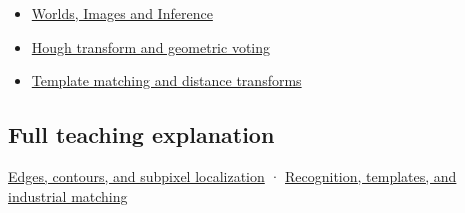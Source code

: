 \begin{itemize}
\tightlist
\item
  \href{Continuous\%20Notes/University\%20-\%20Worlds,\%20Images\%20and\%20Inference\%20-\%20Graphics,\%20Vision\%20and\%20Photography}{Worlds, Images and Inference}
\item
  \hyperref[appendix-a5b0383b3b3e]{Hough transform and geometric voting}
\item
  \hyperref[appendix-5fb4af80d1c7]{Template matching and distance transforms}
\end{itemize}

\subsection{Full teaching explanation}\label{full-teaching-explanation}

\href{Continuous\%20Notes/University\%20-\%20Worlds,\%20Images\%20and\%20Inference\%20-\%20Graphics,\%20Vision\%20and\%20Photography\#Edges,\%20contours,\%20and\%20subpixel\%20localization}{Edges, contours, and subpixel localization} · \href{Continuous\%20Notes/University\%20-\%20Worlds,\%20Images\%20and\%20Inference\%20-\%20Graphics,\%20Vision\%20and\%20Photography\#Recognition,\%20templates,\%20and\%20industrial\%20matching}{Recognition, templates, and industrial matching}
